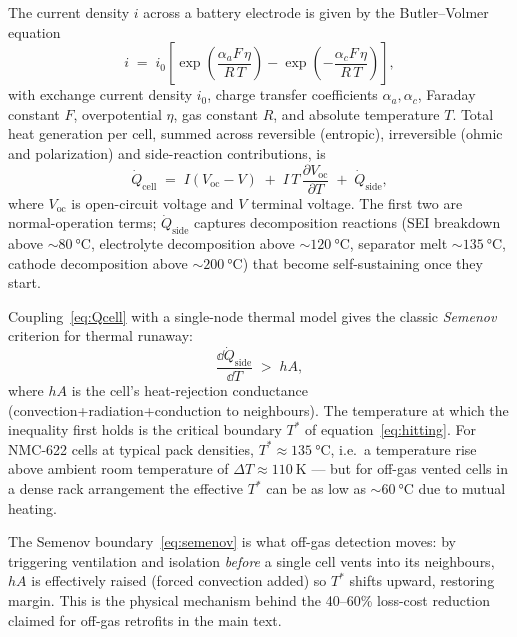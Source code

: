 The current density $i$ across a battery electrode is given by the
Butler--Volmer equation
\begin{equation}\label{eq:BV}
   i \;=\; i_0\left[
   \exp\!\left(\frac{\alpha_a F\,\eta}{R\,T}\right)
   - \exp\!\left(-\frac{\alpha_c F\,\eta}{R\,T}\right)\right],
\end{equation}
with exchange current density $i_0$, charge transfer coefficients
$\alpha_a,\alpha_c$, Faraday constant $F$, overpotential $\eta$, gas
constant $R$, and absolute temperature $T$. Total heat generation
per cell, summed across reversible (entropic), irreversible (ohmic
and polarization) and side-reaction contributions, is
\begin{equation}\label{eq:Qcell}
   \dot Q_{\mathrm{cell}} \;=\;
   I(V_{\mathrm{oc}} - V) \;+\; I\,T\,\frac{\partial V_{\mathrm{oc}}}{\partial T}
   \;+\; \dot Q_{\mathrm{side}},
\end{equation}
where $V_{\mathrm{oc}}$ is open-circuit voltage and $V$ terminal
voltage. The first two are normal-operation terms; $\dot Q_{\mathrm{side}}$
captures decomposition reactions (SEI breakdown above $\sim\SI{80}{\celsius}$,
electrolyte decomposition above $\sim\SI{120}{\celsius}$, separator
melt $\sim\SI{135}{\celsius}$, cathode decomposition above
$\sim\SI{200}{\celsius}$) that become self-sustaining once they
start.

Coupling~\eqref{eq:Qcell} with a single-node thermal model gives the
classic \emph{Semenov} criterion for thermal runaway:
\begin{equation}\label{eq:semenov}
   \boxed{\;
   \frac{\dd \dot Q_{\mathrm{side}}}{\dd T} \;>\; h A,
   \;}
\end{equation}
where $hA$ is the cell's heat-rejection conductance (convection+radiation+conduction
to neighbours). The temperature at which the inequality first holds is
the critical boundary $T^*$ of equation~\eqref{eq:hitting}. For
NMC-622 cells at typical pack densities, $T^*\approx\SI{135}{\celsius}$,
i.e.\ a temperature rise above ambient room temperature of
$\Delta T\approx\SI{110}{\kelvin}$ --- but for off-gas vented cells in
a dense rack arrangement the effective $T^*$ can be as low as
$\sim\SI{60}{\celsius}$ due to mutual heating.

\begin{rbox}
The Semenov boundary~\eqref{eq:semenov} is what off-gas detection
moves: by triggering ventilation and isolation \emph{before} a single
cell vents into its neighbours, $hA$ is effectively raised
(forced convection added) so $T^*$ shifts upward, restoring margin.
This is the physical mechanism behind the 40--60\% loss-cost
reduction claimed for off-gas retrofits in the main text.
\end{rbox}

